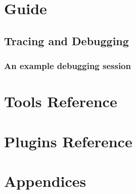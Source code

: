 \mainmatter

\part{Guide}








\chapter{Tracing and Debugging}
\section{An example debugging session}

\part{Tools Reference}







\part{Plugins Reference}

\part{Appendices}



